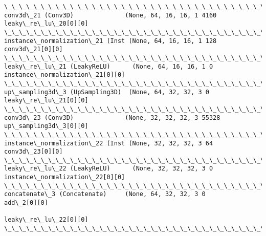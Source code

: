 \documentclass[11pt]{article}
\begin{document}
\begin{Verbatim}[commandchars=\\\{\}]
\_\_\_\_\_\_\_\_\_\_\_\_\_\_\_\_\_\_\_\_\_\_\_\_\_\_\_\_\_\_\_\_\_\_\_\_\_\_\_\_\_\_\_\_\_\_\_\_\_\_\_\_\_\_\_\_\_\_\_\_\_\_\_\_\_\_\_\_\_\_\_\_\_\_\_\_\_\_\_\_\_\_\_\_\_\_\_\_\_\_\_\_\_\_\_\_\_\_
conv3d\_21 (Conv3D)              (None, 64, 16, 16, 1 4160        leaky\_re\_lu\_20[0][0]             
\_\_\_\_\_\_\_\_\_\_\_\_\_\_\_\_\_\_\_\_\_\_\_\_\_\_\_\_\_\_\_\_\_\_\_\_\_\_\_\_\_\_\_\_\_\_\_\_\_\_\_\_\_\_\_\_\_\_\_\_\_\_\_\_\_\_\_\_\_\_\_\_\_\_\_\_\_\_\_\_\_\_\_\_\_\_\_\_\_\_\_\_\_\_\_\_\_\_
instance\_normalization\_21 (Inst (None, 64, 16, 16, 1 128         conv3d\_21[0][0]                  
\_\_\_\_\_\_\_\_\_\_\_\_\_\_\_\_\_\_\_\_\_\_\_\_\_\_\_\_\_\_\_\_\_\_\_\_\_\_\_\_\_\_\_\_\_\_\_\_\_\_\_\_\_\_\_\_\_\_\_\_\_\_\_\_\_\_\_\_\_\_\_\_\_\_\_\_\_\_\_\_\_\_\_\_\_\_\_\_\_\_\_\_\_\_\_\_\_\_
leaky\_re\_lu\_21 (LeakyReLU)      (None, 64, 16, 16, 1 0           instance\_normalization\_21[0][0]  
\_\_\_\_\_\_\_\_\_\_\_\_\_\_\_\_\_\_\_\_\_\_\_\_\_\_\_\_\_\_\_\_\_\_\_\_\_\_\_\_\_\_\_\_\_\_\_\_\_\_\_\_\_\_\_\_\_\_\_\_\_\_\_\_\_\_\_\_\_\_\_\_\_\_\_\_\_\_\_\_\_\_\_\_\_\_\_\_\_\_\_\_\_\_\_\_\_\_
up\_sampling3d\_3 (UpSampling3D)  (None, 64, 32, 32, 3 0           leaky\_re\_lu\_21[0][0]             
\_\_\_\_\_\_\_\_\_\_\_\_\_\_\_\_\_\_\_\_\_\_\_\_\_\_\_\_\_\_\_\_\_\_\_\_\_\_\_\_\_\_\_\_\_\_\_\_\_\_\_\_\_\_\_\_\_\_\_\_\_\_\_\_\_\_\_\_\_\_\_\_\_\_\_\_\_\_\_\_\_\_\_\_\_\_\_\_\_\_\_\_\_\_\_\_\_\_
conv3d\_23 (Conv3D)              (None, 32, 32, 32, 3 55328       up\_sampling3d\_3[0][0]            
\_\_\_\_\_\_\_\_\_\_\_\_\_\_\_\_\_\_\_\_\_\_\_\_\_\_\_\_\_\_\_\_\_\_\_\_\_\_\_\_\_\_\_\_\_\_\_\_\_\_\_\_\_\_\_\_\_\_\_\_\_\_\_\_\_\_\_\_\_\_\_\_\_\_\_\_\_\_\_\_\_\_\_\_\_\_\_\_\_\_\_\_\_\_\_\_\_\_
instance\_normalization\_22 (Inst (None, 32, 32, 32, 3 64          conv3d\_23[0][0]                  
\_\_\_\_\_\_\_\_\_\_\_\_\_\_\_\_\_\_\_\_\_\_\_\_\_\_\_\_\_\_\_\_\_\_\_\_\_\_\_\_\_\_\_\_\_\_\_\_\_\_\_\_\_\_\_\_\_\_\_\_\_\_\_\_\_\_\_\_\_\_\_\_\_\_\_\_\_\_\_\_\_\_\_\_\_\_\_\_\_\_\_\_\_\_\_\_\_\_
leaky\_re\_lu\_22 (LeakyReLU)      (None, 32, 32, 32, 3 0           instance\_normalization\_22[0][0]  
\_\_\_\_\_\_\_\_\_\_\_\_\_\_\_\_\_\_\_\_\_\_\_\_\_\_\_\_\_\_\_\_\_\_\_\_\_\_\_\_\_\_\_\_\_\_\_\_\_\_\_\_\_\_\_\_\_\_\_\_\_\_\_\_\_\_\_\_\_\_\_\_\_\_\_\_\_\_\_\_\_\_\_\_\_\_\_\_\_\_\_\_\_\_\_\_\_\_
concatenate\_3 (Concatenate)     (None, 64, 32, 32, 3 0           add\_2[0][0]                      
                                                                 leaky\_re\_lu\_22[0][0]             
\_\_\_\_\_\_\_\_\_\_\_\_\_\_\_\_\_\_\_\_\_\_\_\_\_\_\_\_\_\_\_\_\_\_\_\_\_\_\_\_\_\_\_\_\_\_\_\_\_\_\_\_\_\_\_\_\_\_\_\_\_\_\_\_\_\_\_\_\_\_\_\_\_\_\_\_\_\_\_\_\_\_\_\_\_\_\_\_\_\_\_\_\_\_\_\_\_\_

\end{Verbatim}
\end{document}
